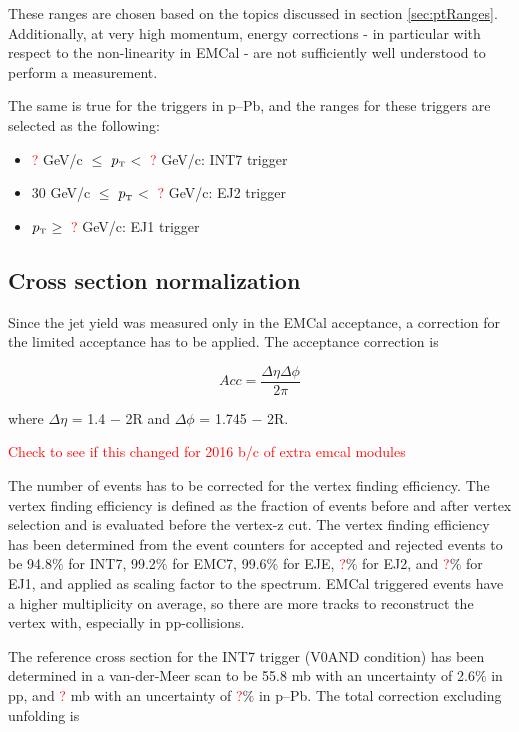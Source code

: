 \documentclass[ALICE]{ALICE_analysis_notes}
\newcommand{\pT}{$p_{\mbox{\tiny T}}$\xspace}
\newcommand{\pPb}{{\mbox{p--Pb}}\xspace}
\newcommand{\pp}{pp\xspace}
\begin{document}
These ranges are chosen based on the topics discussed in section \ref{sec:ptRanges}. Additionally, at very high momentum, energy corrections - in particular with respect to the non-linearity in EMCal - are not sufficiently well understood to perform a measurement.

The same is true for the triggers in \pPb, and the ranges for these triggers are selected as the following:

\begin{itemize}
    \item \textcolor{red}{?} GeV/c $\le$ \pT $<$ \textcolor{red}{?} GeV/c: INT7 trigger
    \item 30 GeV/c $\le$ \pT $<$ \textcolor{red}{?} GeV/c: EJ2 trigger
    \item \pT $\ge$ \textcolor{red}{?} GeV/c: EJ1 trigger
\end{itemize}

\subsection{Cross section normalization}
\label{sec:xsecNomalization}

Since the jet yield was measured only in the EMCal acceptance, a correction for the limited acceptance has to be applied. The acceptance correction is

\begin{equation}
    Acc = \frac{\Delta\eta \Delta\phi}{2\pi}
\end{equation}

where $\Delta\eta$ = 1.4 − 2R and $\Delta\phi$ = 1.745 − 2R.

\textcolor{red}{Check to see if this changed for 2016 b/c of extra emcal modules}

The number of events has to be corrected for the vertex finding efficiency. The vertex finding efficiency is defined as the fraction of events before and after vertex selection and is evaluated before the vertex-z cut. The vertex finding efficiency has been determined from the event counters for accepted and rejected events to be 94.8$\%$ for INT7, 99.2$\%$ for EMC7, 99.6$\%$ for EJE, \textcolor{red}{?}$\%$ for EJ2, and \textcolor{red}{?}$\%$ for EJ1, and applied as scaling factor to the spectrum. EMCal triggered events have a higher multiplicity on average, so there are more tracks to reconstruct the vertex with, especially in pp-collisions.

The reference cross section for the INT7 trigger (V0AND condition) has been determined in a van-der-Meer scan to be 55.8 mb with an uncertainty of 2.6$\%$ in \pp, and \textcolor{red}{?} mb with an uncertainty of \textcolor{red}{?}$\%$ in \pPb. The total correction excluding unfolding is
\end{document}
